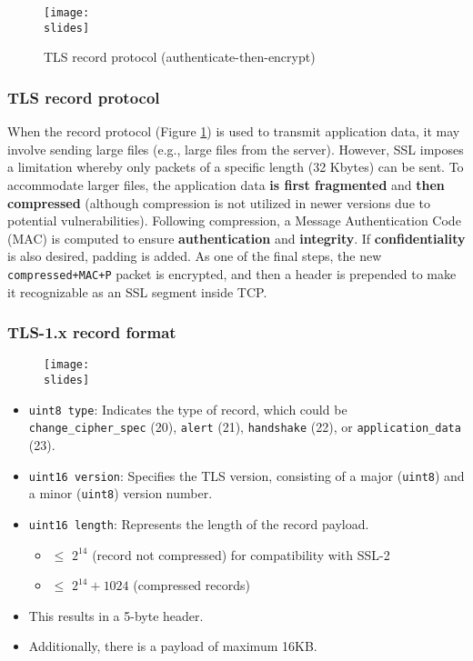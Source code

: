 \begin{figure}[h]
    \centering
    \texttt{[image: \\slides]}
    \caption{TLS record protocol (authenticate-then-encrypt)}
    \label{fig:tls-record-protocol}
\end{figure}


\subsubsection{TLS record protocol}
When the record protocol (Figure \ref*{fig:tls-record-protocol}) is used to transmit application data, it may involve sending large files (e.g., large files from the server). However, SSL imposes a limitation whereby only packets of a specific length (32 Kbytes) can be sent. To accommodate larger files, the application data \textbf{is first fragmented} and \textbf{then compressed} (although compression is not utilized in newer versions due to potential vulnerabilities). Following compression, a Message Authentication Code (MAC) is computed to ensure \textbf{authentication} and \textbf{integrity}. If \textbf{confidentiality} is also desired, padding is added. As one of the final steps, the new \texttt{compressed+MAC+P} packet is encrypted, and then a header is prepended to make it recognizable as an SSL segment inside TCP.

\subsubsection{TLS-1.x record format}

\begin{figure}[h]
    \centering
    \texttt{[image: \\slides]}
\end{figure}

\begin{itemize}
    \item \texttt{uint8 type}: Indicates the type of record, which could be \texttt{change\_cipher\_spec} (20), \texttt{alert} (21), \texttt{handshake} (22), or \texttt{application\_data} (23).

    \item \texttt{uint16 version}: Specifies the TLS version, consisting of a major (\texttt{uint8}) and a minor (\texttt{uint8}) version number.

    \item \texttt{uint16 length}: Represents the length of the record payload.
          \begin{itemize}
              \item $\leq$ $2^{14}$ (record not compressed) for compatibility with SSL-2
              \item $\leq$ $2^{14} + 1024$ (compressed records)
          \end{itemize}

    \item This results in a 5-byte header.

    \item Additionally, there is a payload of maximum 16KB.
\end{itemize}


